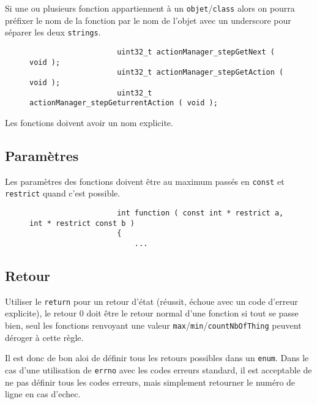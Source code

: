 			Si une ou plusieurs fonction appartiennent à un \verb+objet+/\verb+class+ alors on pourra préfixer le nom de la fonction par le nom de l'objet avec un underscore pour séparer les deux \verb+strings+.

			\begin{figure}[H]
				\begin{changemargin}{-2.5cm}{-2.5cm}
				\begin{tcolorbox}
				\begin{verbatim}
					uint32_t actionManager_stepGetNext ( void );
					uint32_t actionManager_stepGetAction ( void );
					uint32_t actionManager_stepGeturrentAction ( void );
				\end{verbatim}
				\end{tcolorbox}
				\end{changemargin}
			\end{figure}

			Les fonctions doivent avoir un nom explicite.

		\subsection{Paramètres}
			Les paramètres des fonctions doivent être au maximum passés en \verb+const+ et \verb+restrict+ quand c'est possible. 

			\begin{figure}[H]
				\begin{changemargin}{-2.5cm}{-2.5cm}
				\begin{tcolorbox}
				\begin{verbatim}
					int function ( const int * restrict a, int * restrict const b )
					{
					    ...
				\end{verbatim}
				\end{tcolorbox}
				\end{changemargin}
			\end{figure}

		\subsection{Retour}
			Utiliser le \verb+return+ pour un retour d'état (réussit, échoue avec un code d'erreur explicite), le retour 0 doit être le retour normal d'une fonction si tout se passe bien, seul les fonctions renvoyant une valeur \verb+max+/\verb+min+/\verb+countNbOfThing+ peuvent déroger à cette règle.

			Il est donc de bon aloi de définir tous les retours possibles dans un \verb+enum+. Dans le cas d'une utilisation de \verb+errno+ avec les codes erreurs standard, il est acceptable de ne pas définir tous les codes erreurs, mais simplement retourner le numéro de ligne en cas d'echec.

